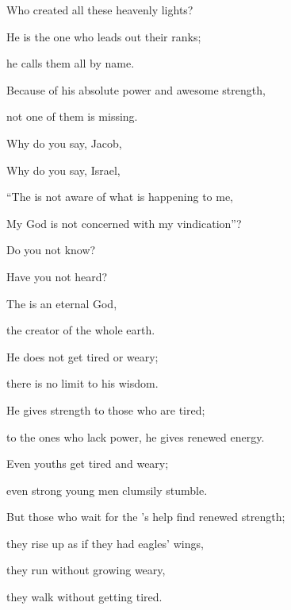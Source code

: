 {\par }{\Q Who
created
all these
heavenly lights?

\par }{\Q He is the one who leads out
their ranks;
\par }{\Q he calls
them all
by name.
\par }{\Q Because of his absolute
power
and awesome
strength,
\par }{\Q not
one
of them is missing.
\par }{\Q {}Why
do you say,
Jacob,
\par }{\Q Why do you say,
Israel,
\par }{\Q “The
{}
is not aware
of what is happening
to me,

\par }{\Q My God
is not concerned
with my vindication”?
\par }{\Q {}Do you not
know?
\par }{\Q Have you not
heard?
\par }{\Q The
{}
is an eternal
God,
\par }{\Q the creator
of the whole earth.
\par }{\Q He does not
get tired
or
weary;
\par }{\Q there is no
limit
to his wisdom.
\par }{\Q {}He gives
strength
to those who are tired;
\par }{\Q to the ones who lack
power,
he gives renewed
energy.
\par }{\Q {}Even youths
get tired
and weary;
\par }{\Q even strong young men
clumsily
stumble.
\par }{\Q {}But those who wait
for the
{}’s
help find renewed
strength;
\par }{\Q they rise up
as if they had eagles’
wings,
\par }{\Q they run
without
growing weary,
\par }{\Q they walk
without
getting tired.

\par }

